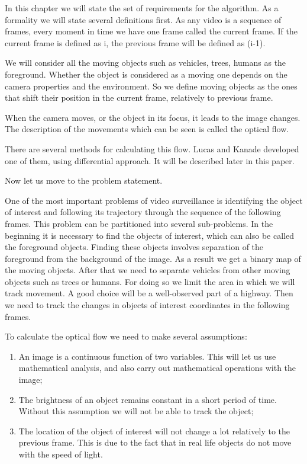 \documentclass[12pt,a4paper,oneside,titlepage]{article}
\begin{document}
In this chapter we will state the set of requirements for the algorithm.
As a formality we will state several definitions first.
As any video is a sequence of frames, every moment in time we have one frame called the current frame.
If the current frame is defined as i, the previous frame will be defined as (i-1).

We will consider all the moving objects such as vehicles, trees, humans as the foreground.
Whether the object is considered as a moving one depends on the camera properties and the environment.
So we define moving objects as the ones that shift their position in the current frame, relatively to previous frame.

When the camera moves, or the object in its focus, it leads to the image changes.
The description of the movements which can be seen is called the optical flow.

There are several methods for calculating this flow.
Lucas and Kanade developed one of them, using differential approach.
It will be described later in this paper.

Now let us move to the problem statement.

One of the most important problems of video surveillance is identifying the object of interest and following its trajectory through the sequence of the following frames.
This problem can be partitioned into several sub-problems.
In the beginning it is necessary to find the objects of interest, which can also be called the foreground objects.
Finding these objects involves separation of the foreground from the background of the image.
As a result we get a binary map of the moving objects.
After that we need to separate vehicles from other moving objects such as trees or humans. 
For doing so we limit the area in which we will track movement.
A good choice will be a well-observed part of a highway. 
Then we need to track the changes in objects of interest coordinates in the following frames.

To calculate the optical flow we need to make several assumptions:
\begin{enumerate}
  \item An image is a continuous function of two variables. This will let us use mathematical analysis, and also carry out mathematical operations with the image;
  \item The brightness of an object remains constant in a short period of time. Without this assumption we will not be able to track the object;
  \item The location of the object of interest will not change a lot relatively to the previous frame. This is due to the fact that in real life objects do not move with the speed of light.
\end{enumerate}
\end{document}
